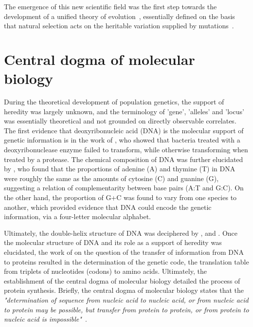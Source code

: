The emergence of this new scientific field was the first step towards the development of a unified theory of evolution~\citep{huxley1942evolution}, essentially defined on the basis that natural selection acts on the heritable variation supplied by mutations~\citep{mayr1959where,stebbins1966processes,dobzhansky1974chance}.


\section{Central dogma of molecular biology}

During the theoretical development of population genetics, the support of heredity was largely unknown, and the terminology of 'gene', 'alleles' and 'locus' was essentially theoretical and not grounded on directly observable correlates.
The first evidence that deoxyribonucleic acid (\acrshort{DNA}) is the molecular support of genetic information is in the work of \citet{Avery1944}, who showed that bacteria treated with a deoxyribonuclease enzyme failed to transform, while otherwise transforming when treated by a protease.
The chemical composition of \acrshort{DNA} was further elucidated by \citet{Chargaff1950}, who found that the proportions of adenine (A) and thymine (T) in \acrshort{DNA} were roughly the same as the amounts of cytosine (C) and guanine (G), suggesting a relation of complementarity between base pairs (A:T and G:C).
On the other hand, the proportion of G+C was found to vary from one species to another, which provided evidence that \acrshort{DNA} could encode the genetic information, via a four-letter molecular alphabet.

Ultimately, the double-helix structure of \acrshort{DNA} was deciphered by \citet{franklin1953molecular}, \citet{watson1953molecular} and \citet{wilkins1953molecular}.
Once the molecular structure of \acrshort{DNA} and its role as a support of heredity was elucidated, the work of \citet{Crick1958} on the question of the transfer of information from \acrshort{DNA} to proteins resulted in the determination of the genetic code, the translation table from triplets of nucleotides (codons) to amino acids.
Ultimately, the establishment of the central dogma of molecular biology detailed the process of protein synthesis.
Briefly, the central dogma of molecular biology states that the \textit{"determination of sequence from nucleic acid to nucleic acid, or from nucleic acid to protein may be possible, but transfer from protein to protein, or from protein to nucleic acid is impossible"}~\citep{Crick1970}.

